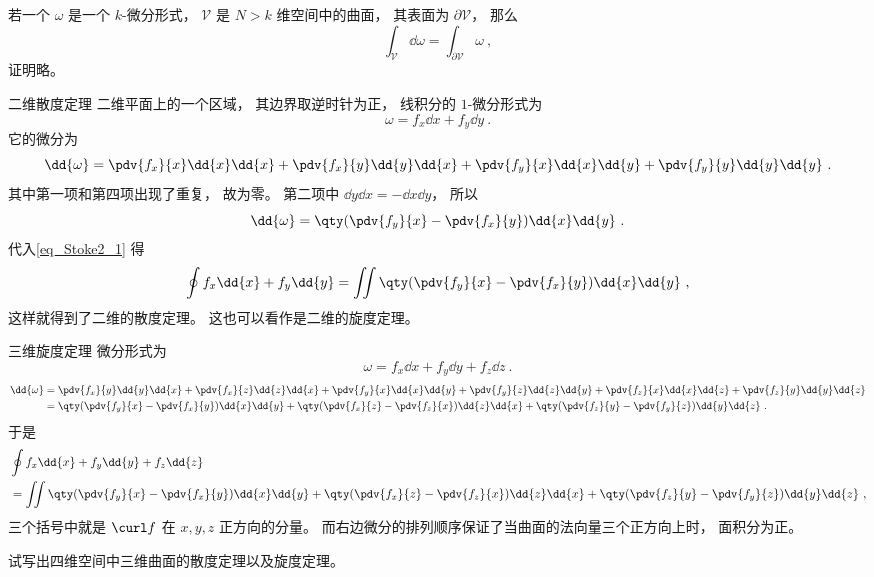 

若一个 $\omega$ 是一个 $k$-微分形式， $\mathcal V$ 是 $N> k$ 维空间中的曲面， 其表面为 $\partial \mathcal V$， 那么
\begin{equation}\label{eq_Stoke2_1}
\int_{\mathcal V} \dd{\omega} = \int_{\partial \mathcal V} \omega~,
\end{equation}
证明略。

\begin{example}{二维散度定理}
二维平面上的一个区域， 其边界取逆时针为正， 线积分的 $1$-微分形式为
\begin{equation}
\omega = f_x \dd{x} + f_y \dd{y}~.
\end{equation}
它的微分为
\begin{equation}
\dd{\omega} = \pdv{f_x}{x}\dd{x}\dd{x} + \pdv{f_x}{y}\dd{y}\dd{x}
+ \pdv{f_y}{x}\dd{x}\dd{y} + \pdv{f_y}{y}\dd{y}\dd{y}~.
\end{equation}
其中第一项和第四项出现了重复， 故为零。 第二项中 $\dd{y}\dd{x} = -\dd{x}\dd{y}$， 所以
\begin{equation}
\dd{\omega} = \qty(\pdv{f_y}{x}-\pdv{f_x}{y})\dd{x}\dd{y}~.
\end{equation}
代入\autoref{eq_Stoke2_1} 得
\begin{equation}
\oint f_x \dd{x} + f_y \dd{y} = \iint \qty(\pdv{f_y}{x}-\pdv{f_x}{y})\dd{x}\dd{y}~,
\end{equation}
这样就得到了二维的散度定理。%
这也可以看作是二维的旋度定理。
\end{example}

\begin{example}{三维旋度定理}
微分形式为
\begin{equation}
\omega = f_x \dd{x} + f_y \dd{y} + f_z \dd{z}~.
\end{equation}
\begin{equation}
\begin{aligned}
\dd{\omega} &= \pdv{f_x}{y}\dd{y}\dd{x} + \pdv{f_x}{z}\dd{z}\dd{x}
+ \pdv{f_y}{x}\dd{x}\dd{y} + \pdv{f_y}{z}\dd{z}\dd{y}
+ \pdv{f_z}{x}\dd{x}\dd{z} + \pdv{f_z}{y}\dd{y}\dd{z}\\
&= \qty(\pdv{f_y}{x}-\pdv{f_x}{y})\dd{x}\dd{y}
+ \qty(\pdv{f_x}{z}- \pdv{f_z}{x})\dd{z}\dd{x}
+ \qty(\pdv{f_z}{y}-\pdv{f_y}{z})\dd{y}\dd{z}~.
\end{aligned}
\end{equation}
于是
\begin{equation}
\begin{aligned}
&\oint f_x \dd{x} + f_y \dd{y} + f_z \dd{z}\\
&= \iint \qty(\pdv{f_y}{x}-\pdv{f_x}{y})\dd{x}\dd{y}
+ \qty(\pdv{f_x}{z}- \pdv{f_z}{x})\dd{z}\dd{x}
+ \qty(\pdv{f_z}{y}-\pdv{f_y}{z})\dd{y}\dd{z}~,
\end{aligned}
\end{equation}
三个括号中就是 $\curl f$ 在 $x,y,z$ 正方向的分量。 而右边微分的排列顺序保证了当曲面的法向量三个正方向上时， 面积分为正。
\end{example}

\begin{exercise}{}
试写出四维空间中三维曲面的散度定理以及旋度定理。
\end{exercise}
